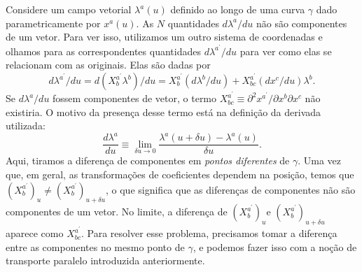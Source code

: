 Considere um campo vetorial $ \lambda^a(u) $ definido ao longo de uma curva $ \gamma $ dado parametricamente por $ x^a(u) $. As $ N $ quantidades $ d \lambda^{a} / d u $ não são componentes de um vetor. Para ver isso, utilizamos um outro sistema de coordenadas e olhamos para as correspondentes quantidades $ d \lambda^{a^{\prime}} / d u $ para ver como elas se relacionam com as originais. Elas são dadas por
\begin{equation}\label{eq:TransformacaoCoordenadasDerivadaCurva}
d \lambda^{a^{\prime}} / d u=d\left(X_{b}^{a^{\prime}} \lambda^{b}\right) / d u=X_{b}^{a^{\prime}}\left(d \lambda^{b} / d u\right)+X_{b c}^{a^{\prime}}\left(d x^{c} / d u\right) \lambda^{b} .
\end{equation}
Se $ d \lambda^{a} / d u $ fossem componentes de vetor, o termo $ X_{b c}^{a^{\prime}} \equiv \partial^{2} x^{a^{\prime}} / \partial x^{b} \partial x^{c} $ não existiria. O motivo da presença desse termo está na definição da derivada utilizada:
\begin{equation}\label{eq:DerivadaTotalLambda}
\frac{d \lambda^{a}}{d u} \equiv \lim _{\delta u \rightarrow 0} \frac{\lambda^{a}(u+\delta u)-\lambda^{a}(u)}{\delta u} .
\end{equation}
Aqui, tiramos a diferença de componentes em \textit{pontos diferentes} de $ \gamma $. Uma vez que, em geral, as transformações de coeficientes dependem na posição, temos que $ \left(X_{b}^{a^{\prime}}\right)_{u} \neq\left(X_{b}^{a^{\prime}}\right)_{u+\delta u} $, o que significa que as diferenças de componentes não são componentes de um vetor. No limite, a diferença de $ \left(X_{b}^{a^{\prime}}\right)_{u} \text{e } \left(X_{b}^{a^{\prime}}\right)_{u+\delta u} $ aparece como $ X_{b c}^{a^{\prime}} $. Para resolver esse problema, precisamos tomar a diferença entre as componentes no mesmo ponto de $ \gamma $, e podemos fazer isso com a noção de transporte paralelo introduzida anteriormente.

